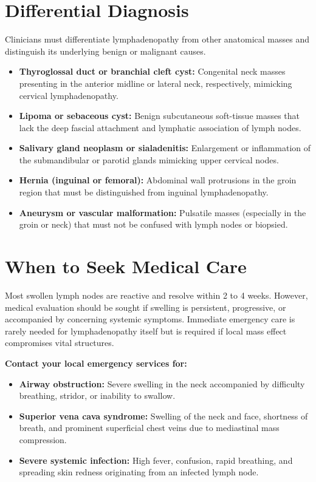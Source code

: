 \section*{Differential Diagnosis}
Clinicians must differentiate lymphadenopathy from other anatomical masses and distinguish its underlying benign or malignant causes.
\begin{itemize}
    \item \textbf{Thyroglossal duct or branchial cleft cyst:} Congenital neck masses presenting in the anterior midline or lateral neck, respectively, mimicking cervical lymphadenopathy.
    \item \textbf{Lipoma or sebaceous cyst:} Benign subcutaneous soft-tissue masses that lack the deep fascial attachment and lymphatic association of lymph nodes.
    \item \textbf{Salivary gland neoplasm or sialadenitis:} Enlargement or inflammation of the submandibular or parotid glands mimicking upper cervical nodes.
    \item \textbf{Hernia (inguinal or femoral):} Abdominal wall protrusions in the groin region that must be distinguished from inguinal lymphadenopathy.
    \item \textbf{Aneurysm or vascular malformation:} Pulsatile masses (especially in the groin or neck) that must not be confused with lymph nodes or biopsied.
\end{itemize}

\section*{When to Seek Medical Care}
Most swollen lymph nodes are reactive and resolve within 2 to 4 weeks. However, medical evaluation should be sought if swelling is persistent, progressive, or accompanied by concerning systemic symptoms. Immediate emergency care is rarely needed for lymphadenopathy itself but is required if local mass effect compromises vital structures.

\textbf{Contact your local emergency services for:}
\begin{itemize}
    \item \textbf{Airway obstruction:} Severe swelling in the neck accompanied by difficulty breathing, stridor, or inability to swallow.
    \item \textbf{Superior vena cava syndrome:} Swelling of the neck and face, shortness of breath, and prominent superficial chest veins due to mediastinal mass compression.
    \item \textbf{Severe systemic infection:} High fever, confusion, rapid breathing, and spreading skin redness originating from an infected lymph node.
\end{itemize}


